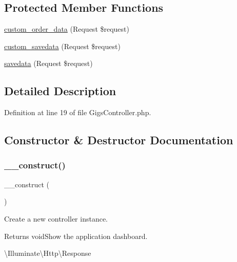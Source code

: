 \subsection*{Protected Member Functions}
\begin{DoxyCompactItemize}
\item 
\mbox{\hyperlink{class_responsive_1_1_http_1_1_controllers_1_1_gigs_controller_a1e523a1a30c0216f457be90c4e6ae19f}{custom\+\_\+order\+\_\+data}} (Request \$request)
\item 
\mbox{\hyperlink{class_responsive_1_1_http_1_1_controllers_1_1_gigs_controller_ac3a5f5a889fdb8bb9858fb102b403927}{custom\+\_\+savedata}} (Request \$request)
\item 
\mbox{\hyperlink{class_responsive_1_1_http_1_1_controllers_1_1_gigs_controller_a39992cc1c190dd16b2de573a70a7f5dc}{savedata}} (Request \$request)
\end{DoxyCompactItemize}


\subsection{Detailed Description}


Definition at line 19 of file Gigs\+Controller.\+php.



\subsection{Constructor \& Destructor Documentation}
\mbox{\label{class_responsive_1_1_http_1_1_controllers_1_1_gigs_controller_a095c5d389db211932136b53f25f39685}} 
\subsubsection{\texorpdfstring{\_\_construct()}{\_\_construct()}}
{\footnotesize\ttfamily \+\_\+\+\_\+construct (\begin{DoxyParamCaption}{ }\end{DoxyParamCaption})}

Create a new controller instance.

\begin{DoxyReturn}{Returns}
void\+Show the application dashboard.

\textbackslash{}\+Illuminate\textbackslash{}\+Http\textbackslash{}\+Response 
\end{DoxyReturn}


